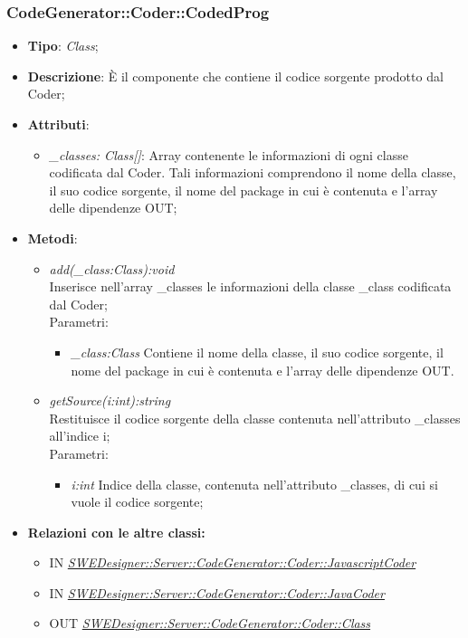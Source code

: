\documentclass[../DefinizioneDiProdotto.tex]{subfiles}
\begin{document}
			\subsubsection{CodeGenerator::Coder::CodedProg}
			\hypertarget{SWEDesigner::Server::CodeGenerator::Coder::CodedProg}{}
			\begin{itemize}
				\item \textbf{Tipo}: \emph{Class};
				\item \textbf{Descrizione}: È il componente che contiene il codice sorgente prodotto dal Coder; \\
				\item \textbf{Attributi}:
				\begin{itemize}
					\item \emph{\_classes: Class[]}: Array contenente le informazioni di ogni classe codificata dal Coder. Tali informazioni comprendono il nome della classe, il suo codice sorgente, il nome del package in cui è contenuta e l'array delle dipendenze OUT;
				\end{itemize}
				\item \textbf{Metodi}:
				\begin{itemize}
					\item \emph{add(\_class:Class):void} \\ 
					Inserisce nell'array \_classes le informazioni della classe \_class codificata dal Coder; \\
					Parametri:
					\begin{itemize}
						\item \emph{\_class:Class} Contiene il nome della classe, il suo codice sorgente, il nome del package in cui è contenuta e l'array delle dipendenze OUT.
					\end{itemize}
					
					\item \emph{getSource(i:int):string} \\ 
					Restituisce il codice sorgente della classe contenuta nell'attributo \_classes all'indice i; \\
					Parametri:
					\begin{itemize}
						\item \emph{i:int} Indice della classe, contenuta nell'attributo \_classes, di cui si vuole il codice sorgente;
					\end{itemize}
				\end{itemize}
				
				\item \textbf{Relazioni con le altre classi:}
				\begin{itemize}
					\item IN \hyperlink{SWEDesigner::Server::CodeGenerator::Coder::JavascriptCoder}{\emph{SWEDesigner::Server::CodeGenerator::Coder::JavascriptCoder}}
					\item IN \hyperlink{SWEDesigner::Server::CodeGenerator::Coder::JavaCoder}{\emph{SWEDesigner::Server::CodeGenerator::Coder::JavaCoder}}
					\item OUT \hyperlink{SWEDesigner::Server::CodeGenerator::Coder::JavascriptCoder}{\emph{SWEDesigner::Server::CodeGenerator::Coder::Class}}
				\end{itemize}	
			\end{itemize}
			
\end{document}
